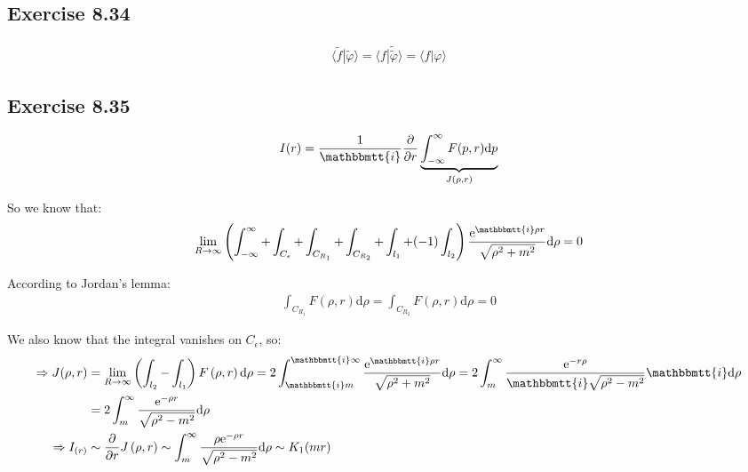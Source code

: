 \documentclass[]{ctexart}
\newcommand{\mi}{\mathbbmtt{i}}
\newcommand{\di}{\mathrm{d}}
\newcommand{\me}{\mathrm{e}}
\begin{document}
	\subsection{Exercise 8.34}
		\begin{equation*}
		\begin{aligned}
			\langle\tilde{f}|\tilde{\varphi}\rangle=\langle f|\tilde{\tilde{\varphi}}\rangle=\langle f|\varphi\rangle
		\end{aligned}
		\end{equation*}
		
	\subsection{Exercise 8.35}
		\begin{equation*}
		\begin{aligned}
			I(r)=\frac{1}{\mi} \frac{\partial}{\partial r}\underbrace{\int_{-\infty}^{\infty} F(p, r) \di p}_{J(\rho,r)}
		\end{aligned}
		\end{equation*}
		
	So we know that:
		\begin{equation*}
		\begin{aligned}
			\lim _{R \rightarrow \infty}\left(\int_{-\infty}^{\infty}+\int_{C_{\epsilon}}+\int_{C_{R_{1}}}+\int_{C_{R_{2}}}+\int_{l_{1}}+(-1) \int_{l_{2}}\right) \frac{\me^{\mi \rho r}}{\sqrt{\rho^{2}+m^{2}}}\di \rho=0
		\end{aligned}
		\end{equation*}
		
	According to Jordan's lemma:
		\begin{equation*}
		\begin{aligned}
			\int_{C_{R_{1}}} F(\rho, r) \di 
			 \rho=\int_{C_{R_{2}}} F(\rho, r) \di \rho=0
		\end{aligned}
		\end{equation*}
		
	We also know that the integral vanishes on $C_{\epsilon}$, so:
		\begin{equation*}
		\begin{aligned}
		\Rightarrow  J(\rho, r) &=\lim _{R \rightarrow \infty}\left(\int_{l_{2}}-\int_{l_{1}}\right) F\left(\rho, r\right) \di \rho=2 \int_{\mi m}^{\mi \infty} \frac{\me^{\mi \rho r}}{\sqrt{\rho^{2}+m^{2}}} \di \rho=2 \int_{m}^{\infty} \frac{\me^{-r \rho}}{\mi \sqrt{\rho^{2}-m^{2}}}\mi \di \rho \\
		&=2 \int_{m}^{\infty} \frac{\me^{-\rho r}}{\sqrt{\rho^{2}-m^{2}}} \di \rho \\
		\Rightarrow I_{(r)} & \sim \frac{\partial}{\partial r} J\left(\rho,r\right) \sim \int_{m}^{\infty} \frac{\rho \me^{-\rho r}}{\sqrt{\rho^{2}-m^{2}}} \di \rho \sim K_{1}(m r)
		\end{aligned}
		\end{equation*}
\end{document}
